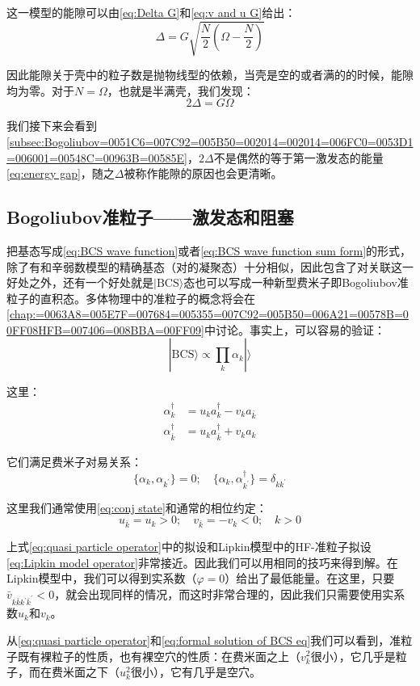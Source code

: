 这一模型的能隙可以由\ref{eq:Delta G}和\ref{eq:v and u G}给出：
\[
\Delta=G\sqrt{\frac{N}{2}\left(\Omega-\frac{N}{2}\right)}
\]

因此能隙关于壳中的粒子数是抛物线型的依赖，当壳是空的或者满的的时候，能隙均为零。对于$N=\Omega$，也就是半满壳，我们发现：
\[
2\Delta=G\Omega
\]

我们接下来会看到\ref{subsec:Bogoliubov=0051C6=007C92=005B50=002014=002014=006FC0=0053D1=006001=00548C=00963B=00585E}，$2\Delta$不是偶然的等于第一激发态的能量\ref{eq:energy gap}，随之$\Delta$被称作能隙的原因也会更清晰。

\subsection{Bogoliubov准粒子——激发态和阻塞\label{subsec:Bogoliubov=0051C6=007C92=005B50=002014=002014=006FC0=0053D1=006001=00548C=00963B=00585E}}

把基态写成\ref{eq:BCS wave function}或者\ref{eq:BCS wave function sum form}的形式，除了有和辛弱数模型的精确基态（对的凝聚态）十分相似，因此包含了对关联这一好处之外，还有一个好处就是$|\text{BCS}\rangle$态也可以写成一种新型费米子即Bogoliubov准粒子的直积态。多体物理中的准粒子的概念将会在\ref{chap:=0063A8=005E7F=007684=005355=007C92=005B50=006A21=00578B=00FF08HFB=007406=008BBA=00FF09}中讨论。事实上，可以容易的验证：
\[
|\text{BCS}\rangle\propto\prod_{k}\alpha_{k}|\rangle
\]

这里：
\begin{align}
\alpha^{\dagger}_{k} & =u_{k}a^{\dagger}_{k}-v_{k}a_{\bar{k}}\nonumber \\
\alpha^{\dagger}_{\bar{k}} & =u_{k}a^{\dagger}_{\bar{k}}+v_{k}a_{k}\label{eq:quasi particle operator}
\end{align}

它们满足费米子对易关系：
\[
\{\alpha_{k},\alpha_{k^{\prime}}\}=0;\quad\{\alpha_{k},\alpha^{\dagger}_{k^{\prime}}\}=\delta_{kk^{\prime}}
\]

这里我们通常使用\ref{eq:conj state}和通常的相位约定：
\[
u_{\bar{k}}=u_{k}>0;\quad v_{\bar{k}}=-v_{k}<0;\quad k>0
\]

上式\ref{eq:quasi particle operator}中的拟设和Lipkin模型中的HF-准粒子拟设\ref{eq:Lipkin model operator}非常接近。因此我们可以用相同的技巧来得到解。在Lipkin模型中，我们可以得到实系数（$\varphi=0$）给出了最低能量。在这里，只要$\bar{v}_{k\bar{k}k^{\prime}\bar{k}^{\prime}}<0$，就会出现同样的情况，而这时非常合理的，因此我们只需要使用实系数$u_{k}$和$v_{k}$。

从\ref{eq:quasi particle operator}和\ref{eq:formal solution of BCS eq}我们可以看到，准粒子既有裸粒子的性质，也有裸空穴的性质：在费米面之上（$v^{2}_{k}$很小），它几乎是粒子，而在费米面之下（$u^{2}_{k}$很小），它有几乎是空穴。

